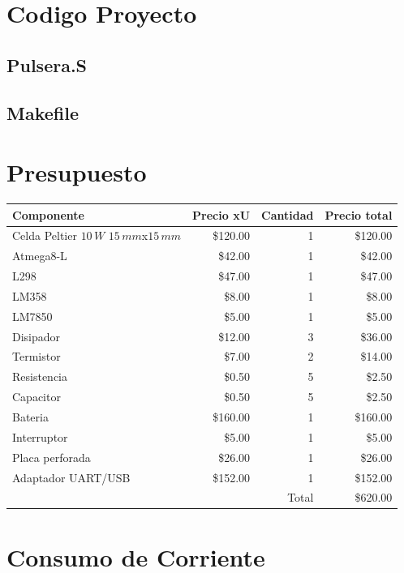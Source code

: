 \documentclass[10pt,spanish,a4paper,openany,notitlepage]{article}
\begin{document}
\appendix 

\newpage
\section{Codigo Proyecto}
\subsection{Pulsera.S}

\newpage
\lstset{language=Make}
\subsection{Makefile}


\newpage
\section{Presupuesto}

\begin{center}
\begin{tabular}{|l|r|r|r|}\hline
Componente&Precio xU&Cantidad&Precio total\\ \hline
Celda Peltier $10\, \unit{W}$ $15\, \unit{mm}$x$15\, \unit{mm}$ &\$120.00&1&\$120.00\\ \hline
Atmega8-L &\$42.00&1&\$42.00\\ \hline
L298 &\$47.00&1&\$47.00\\ \hline
LM358 &\$8.00&1&\$8.00\\ \hline
LM7850 &\$5.00&1&\$5.00\\ \hline
Disipador &\$12.00&3&\$36.00\\ \hline
Termistor &\$7.00&2&\$14.00\\ \hline
Resistencia &\$0.50&5&\$2.50\\ \hline
Capacitor &\$0.50&5&\$2.50\\ \hline 
Bateria &\$160.00&1&\$160.00\\ \hline
Interruptor &\$5.00&1&\$5.00\\ \hline
Placa perforada &\$26.00&1&\$26.00\\ \hline
Adaptador UART/USB & \$152.00 & 1 & \$152.00 \\ \hline 
\multicolumn{3}{|r|}{Total}&\$620.00\\ \hline
\end{tabular}
\end{center}

\section{Consumo de Corriente}
\end{document}
